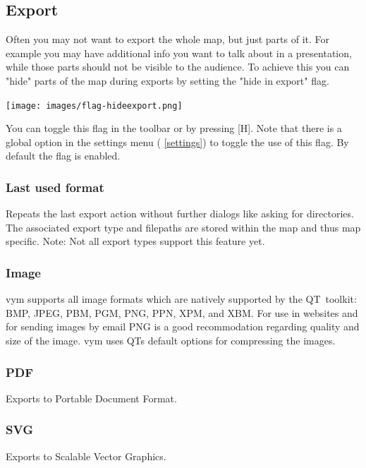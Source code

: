 \documentclass[12pt,a4paper]{article}
\newcommand{\vym}{{\sc vym }}
\newcommand{\key}[1]{[#1]}
\begin{document}
\subsection{Export}  \label{export}
\label{hideexport}
Often you may not want to export the whole map, but just parts of it.
For example you may have additional info you want to talk about in a
presentation, while those parts should not be visible to the audience.
To achieve this you can "hide" parts of the map during exports by
setting the "hide in export" flag.
\begin{center}
    \texttt{[image: images/flag-hideexport.png]}
\end{center}
You can toggle this flag in the toolbar or by pressing \key{H}.  Note
that there is a global option in the settings menu ( \ref{settings}) to
toggle the use of this flag. By default the flag is enabled.

\subsubsection{Last used format}
Repeats the last export action without further dialogs like asking for
directories. The associated export type and filepaths are stored within
the map and thus map specific. Note: Not all export types support this
feature yet.

\subsubsection{Image}
\vym supports all image formats which are natively supported by the
QT~toolkit:
BMP, JPEG, PBM, PGM, PNG, PPN, XPM, and XBM.
For use in websites and for sending images by email PNG is a good
recommodation regarding quality and size of the image. \vym uses QTs
default options for compressing the images.

\subsubsection{PDF}
Exports to Portable Document Format.

\subsubsection{SVG}
Exports to Scalable Vector Graphics.
\end{document}
